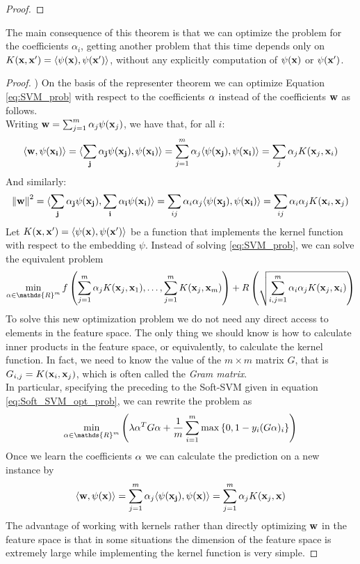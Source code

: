 \documentclass[12pt]{report}
\theoremstyle{plain}
\newcommand\sprod[2]{\langle \vb{#1},\vb{#2}\rangle}
\begin{document}
\begin{flushleft}
\begin{proof}
\end{proof}
The main consequence of this theorem is that we can optimize the problem for the coefficients $\alpha_i$, getting another problem that this time depends only on $K(\vb{x},\vb{x'})=\sprod{\psi(x)}{\psi(x')}$, without any explicitly computation of $\psi(\vb{x})$ or $\psi(\vb{x}')$.\\
\begin{proof})
	On the basis of the representer theorem we can optimize Equation \ref{eq:SVM_prob} with respect to the coefficients $\vb{\alpha}$ instead of the coefficients $\vb{w}$ as follows.\\
	Writing $\vb{w}=\sum_{j=1}^m\alpha_j\psi(\vb{x}_j)$, we have that, for all $i$:
	\[ \sprod{w}{\psi(x_i)}=\sprod{\sum_j\alpha_j\psi(\vb{x_j})}{\psi(x_i)} = \sum_{j=1}^m\alpha_j\sprod{\psi(\vb{x}_j)}{\psi(\vb{x}_i)} = \sum_j\alpha_j K(\vb{x}_j,\vb{x}_i) \]	
	And similarly:
	\[ \norm{\vb{w}}^2=\sprod{\sum_j\alpha_j\psi(\vb{x}_j)}{\sum_i\alpha_i\psi(\vb{x}_i)} =\sum_{ij}\alpha_i\alpha_j\sprod{\psi(\vb{x}_j)}{\psi(\vb{x}_i)} = \sum_{ij}\alpha_i\alpha_jK(\vb{x}_i,\vb{x}_j) \]	
	Let $K(\vb{x},\vb{x}')=\sprod{\psi(\vb{x})}{\psi(\vb{x}')}$ be a function that implements the kernel function with respect to the embedding $\psi$. Instead of solving \ref{eq:SVM_prob}, we can solve the equivalent problem
	\[ \min_{\vb{\alpha}\in\mathds{R}^m} f\left(\sum_{j=1}^m\alpha_jK(\vb{x}_j,\vb{x}_1),\dots,\sum_{j=1}^mK(\vb{x}_j,\vb{x}_m)\right) +R\left(\sqrt{\sum_{i,j=1}^m\alpha_i\alpha_jK(\vb{x}_j,\vb{x}_i)}\right) \]
	To solve this new optimization problem we do not need any direct access to elements in the feature space. The only thing we should know is how to calculate inner products in the feature space, or equivalently, to calculate the kernel function. In fact, we need to know the value of the $m\times m$ matrix $G$, that is $G_{i,j}=K(\vb{x}_i,\vb{x}_j)$, which is often called the \textit{Gram matrix}.\\
	In particular, specifying the preceding to the Soft-SVM given in equation \ref{eq:Soft_SVM_opt_prob}, we can rewrite the problem as
	\begin{equation} \min_{\vb{\alpha}\in\mathds{R}^m}\left(\lambda\vb{\alpha}^TG\vb{\alpha}+\frac{1}{m}\sum_{i=1}^m\max\left\{0,1-y_i(G\vb{\alpha})_i\right\}\right)
	\label{eq:kernel_softSVM}
	\end{equation}
 	Once we learn the coefficients $\vb{\alpha}$ we can calculate the prediction on a new
 	instance by
 	\[ \sprod{w}{\psi(x)} = \sum_{j=1}^m\alpha_j\sprod{\psi(x_j)}{\psi(x)}=\sum_{j=1}^m\alpha_jK(\vb{x}_j,\vb{x}) \]
 	The advantage of working with kernels rather than directly optimizing $\vb{w}$ in the feature space is that in some situations the dimension of the feature space is extremely large while implementing the kernel function is very simple.
\end{proof}


\end{flushleft}
\end{document}
